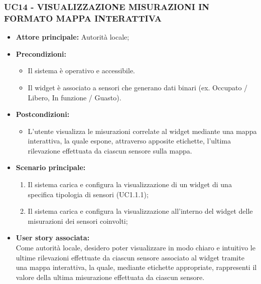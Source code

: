 \subsubsection{UC14 - VISUALIZZAZIONE MISURAZIONI IN FORMATO MAPPA INTERATTIVA}
\begin{itemize}
    \item \textbf{Attore principale:} Autorità locale;
    \item \textbf{Precondizioni:}
        \begin{itemize}
            \item Il sistema è operativo e accessibile.
            \item Il widget è associato a sensori che generano dati binari (ex. Occupato / Libero, In funzione / Guasto).
        \end{itemize}
    \item \textbf{Postcondizioni:}
        \begin{itemize}
            \item L'utente visualizza le misurazioni correlate al widget mediante una mappa interattiva, la quale espone, attraverso apposite etichette, l'ultima rilevazione effettuata da ciascun sensore sulla mappa.
        \end{itemize}
    \item \textbf{Scenario principale:}
        \begin{enumerate}
            \item Il sistema carica e configura la visualizzazione di un widget di una specifica tipologia di sensori (UC1.1.1);
            \item Il sistema carica e configura la visualizzazione all'interno del widget delle misurazioni dei sensori coinvolti;
        \end{enumerate}
    \item \textbf{User story associata:} \\
        Come autorità locale, desidero poter visualizzare in modo chiaro e intuitivo le ultime rilevazioni effettuate da ciascun sensore associato al widget tramite una mappa interattiva, la quale, mediante etichette appropriate, rappresenti il valore della ultima misurazione effettuata da ciascun sensore.
\end{itemize}
